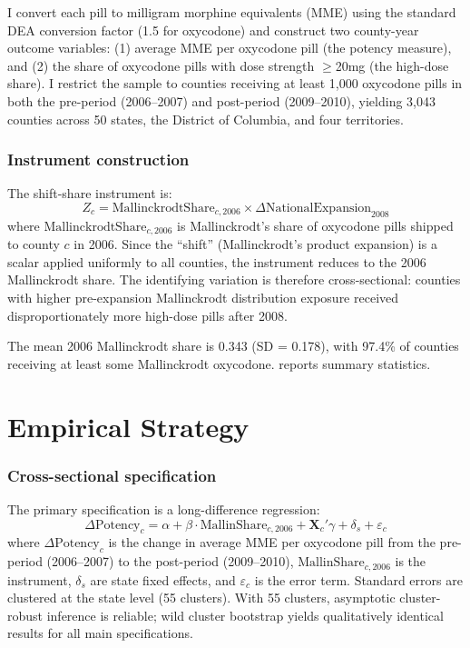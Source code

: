 \documentclass[12pt]{article}
\begin{document}
I convert each pill to milligram morphine equivalents (MME) using the standard DEA conversion factor (1.5 for oxycodone) and construct two county-year outcome variables: (1) average MME per oxycodone pill (the potency measure), and (2) the share of oxycodone pills with dose strength $\geq$20mg (the high-dose share). I restrict the sample to counties receiving at least 1,000 oxycodone pills in both the pre-period (2006--2007) and post-period (2009--2010), yielding 3,043 counties across 50 states, the District of Columbia, and four territories.

\subsubsection*{Instrument construction} The shift-share instrument is:
\begin{equation}
Z_c = \text{MallinckrodtShare}_{c,2006} \times \Delta\text{NationalExpansion}_{2008}
\label{eq:instrument}
\end{equation}
where $\text{MallinckrodtShare}_{c,2006}$ is Mallinckrodt's share of oxycodone pills shipped to county $c$ in 2006. Since the ``shift'' (Mallinckrodt's product expansion) is a scalar applied uniformly to all counties, the instrument reduces to the 2006 Mallinckrodt share. The identifying variation is therefore cross-sectional: counties with higher pre-expansion Mallinckrodt distribution exposure received disproportionately more high-dose pills after 2008.

The mean 2006 Mallinckrodt share is 0.343 (SD = 0.178), with 97.4\% of counties receiving at least some Mallinckrodt oxycodone.  reports summary statistics.




\section{Empirical Strategy}
\label{sec:strategy}

\subsubsection*{Cross-sectional specification} The primary specification is a long-difference regression:
\begin{equation}
\Delta\text{Potency}_c = \alpha + \beta \cdot \text{MallinShare}_{c,2006} + \mathbf{X}_c'\gamma + \delta_s + \varepsilon_c
\label{eq:firststage}
\end{equation}
where $\Delta\text{Potency}_c$ is the change in average MME per oxycodone pill from the pre-period (2006--2007) to the post-period (2009--2010), $\text{MallinShare}_{c,2006}$ is the instrument, $\delta_s$ are state fixed effects, and $\varepsilon_c$ is the error term. Standard errors are clustered at the state level (55 clusters). With 55 clusters, asymptotic cluster-robust inference is reliable; wild cluster bootstrap \citep{cameron2008bootstrap} yields qualitatively identical results for all main specifications.
\end{document}
